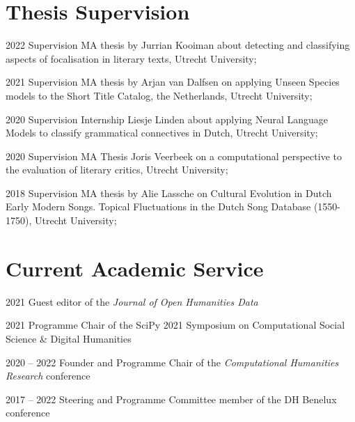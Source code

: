 \documentclass[12pt,letterpaper]{report}
\begin{document}
\section*{Thesis Supervision}
\begin{tablist}
  \item[2022] \tab{}Supervision MA thesis by Jurrian Kooiman about detecting and
    classifying aspects of focalisation in literary texts, Utrecht University;
  \item[2021] \tab{}Supervision MA thesis by Arjan van Dalfsen on applying
    Unseen Species models to the Short Title Catalog, the Netherlands, Utrecht University;
  \item[2020] \tab{}Supervision Internship Liesje Linden about applying Neural Language
    Models to classify grammatical connectives in Dutch, Utrecht University;
  \item[2020] \tab{}Supervision MA Thesis Joris Veerbeek on a computational perspective to
    the evaluation of literary critics, Utrecht University;
  \item[2018] \tab{} Supervision MA thesis by Alie Lassche on Cultural Evolution
    in Dutch Early Modern Songs. Topical Fluctuations in the Dutch Song Database
    (1550-1750), Utrecht University;
\end{tablist}

\section*{Current Academic Service}
\begin{tablist}
\item[2021] \tab{}Guest editor of the \textit{Journal of Open Humanities Data}
\item[2021] \tab{}Programme Chair of the SciPy 2021 Symposium on Computational Social Science
  \& Digital Humanities
\item[2020 -- 2022] \tab{}Founder and Programme Chair of the \textit{Computational Humanities
    Research} conference
\item[2017 -- 2022] \tab{}Steering and Programme Committee member of the DH Benelux conference
\end{tablist}
\end{document}
